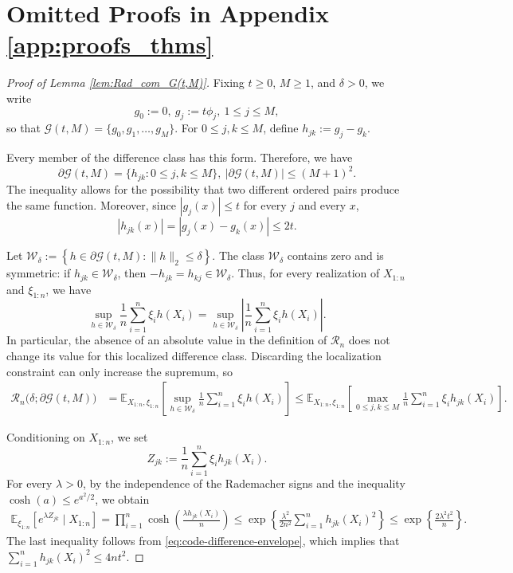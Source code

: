 \documentclass[11pt]{article}
\begin{document}
\section{Omitted Proofs in Appendix \ref{app:proofs_thms}}
\begin{proof}[Proof of Lemma \ref{lem:Rad_com_G(t,M)}]
Fixing \(t\geq0\), \(M\geq1\), and \(\delta>0\), we  write
\[
g_0:=0,
\ 
g_j:=t\phi_j,\  1\leq j\leq M,
\]
so that $\mathcal G(t,M)=\{g_0,g_1,\ldots,g_M\}$.
For \(0\leq j,k\leq M\), define $h_{jk}:=g_j-g_k$.

Every member of the difference class has this form.   Therefore, we have
\[
\partial\mathcal G(t,M)
=
\{h_{jk}:0\leq j,k\leq M\},
\ 
|\partial\mathcal G(t,M)|\leq(M+1)^2.
\]
The inequality allows for the possibility that two different ordered pairs
produce the same function.  Moreover, since \(|g_j(x)|\leq t\) for every
\(j\) and every \(x\),
\begin{equation}
|h_{jk}(x)|
=
|g_j(x)-g_k(x)|
\leq2t.
\label{eq:code-difference-envelope}
\end{equation}

Let $\mathcal W_\delta
:=
\left\{
h\in\partial\mathcal G(t,M):\|h\|_2\leq\delta
\right\}$. The class \(\mathcal W_\delta\) contains zero and is symmetric: if
\(h_{jk}\in\mathcal W_\delta\), then
\(-h_{jk}=h_{kj}\in\mathcal W_\delta\).  Thus, for every realization of
\(X_{1:n}\) and \(\xi_{1:n}\), we have
\[
\sup_{h\in\mathcal W_\delta}
\frac1n\sum_{i=1}^n\xi_i h(X_i)
=
\sup_{h\in\mathcal W_\delta}
\left|
\frac1n\sum_{i=1}^n\xi_i h(X_i)
\right|.
\]
In particular, the absence of an absolute value in the definition of
\(\mathcal R_n\) does not change its value for this localized difference
class.  Discarding the localization constraint can only increase the
supremum, so
\begin{align}
\mathcal R_n\bigl(\delta;\partial\mathcal G(t,M)\bigr)
&=
\mathbb E_{X_{1:n},\xi_{1:n}}
\left[
\sup_{h\in\mathcal W_\delta}
\frac1n\sum_{i=1}^n\xi_i h(X_i)
\right]\leq
\mathbb E_{X_{1:n},\xi_{1:n}}
\left[
\max_{0\leq j,k\leq M}
\frac1n\sum_{i=1}^n\xi_i h_{jk}(X_i)
\right].
\label{eq:localized-to-global-code}
\end{align}

Conditioning on \(X_{1:n}\), we set
\[
Z_{jk}
:=
\frac1n\sum_{i=1}^n\xi_i h_{jk}(X_i).
\]
For every \(\lambda>0\), by the independence of the Rademacher signs and the
inequality \(\cosh(a)\leq e^{a^2/2}\), we obtain
\begin{align}
\mathbb E_{\xi_{1:n}}
\left[
e^{\lambda Z_{jk}}
\mid X_{1:n}
\right]=
\prod_{i=1}^n
\cosh\left(
\frac{\lambda h_{jk}(X_i)}{n}
\right)\leq
\exp\left\{
\frac{\lambda^2}{2n^2}
\sum_{i=1}^n h_{jk}(X_i)^2
\right\}\leq
\exp\left\{
\frac{2\lambda^2t^2}{n}
\right\}.
\label{eq:code-difference-mgf}
\end{align}
The last inequality follows from
\eqref{eq:code-difference-envelope}, which implies that $\sum_{i=1}^n h_{jk}(X_i)^2\leq4nt^2$.


\end{proof}
\end{document}
